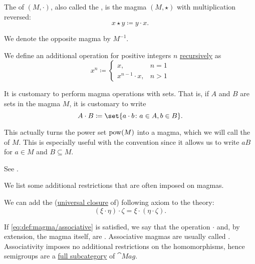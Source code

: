 \begin{definition}
\begin{thmenum}[series=def:magma]
     The  of \( (M, \cdot) \), also called the , is the magma \( (M, \star) \) with multiplication reversed:
    \begin{equation*}
      x \star y \coloneqq y \cdot x.
    \end{equation*}

    We denote the opposite magma by \( M^{-1} \).

     We define an additional  operation for positive integers \( n \) \hyperref[rem:natural_number_recursion]{recursively} as
    \begin{equation}\label{eq:def:magma/exponentiation}
      x^n \coloneqq \begin{cases}
        x,               &n = 1 \\
        x^{n-1} \cdot x, &n > 1
      \end{cases}
    \end{equation}

     It is customary to perform magma operations with sets. That is, if \( A \) and \( B \) are sets in the magma \( M \), it is customary to write
    \begin{equation*}
      A \cdot B \coloneqq \set{ a \cdot b \colon a \in A, b \in B }.
    \end{equation*}

    This actually turns the power set \( \operatorname{pow}(M) \) into a magma, which we will call the  of \( M \). This is especially useful with the convention  since it allows us to write \( aB \) for \( a \in M \) and \( B \subseteq M \).

    See .
  \end{thmenum}

  We list some additional restrictions that are often imposed on magmas.
  \begin{thmenum}[resume=def:magma]
     We can add the (\hyperref[thm:implicit_universal_quantification]{universal closure} of) following axiom to the theory:
    \begin{equation}\label{eq:def:magma/associative}
      (\xi \cdot \eta) \cdot \zeta = \xi \cdot (\eta \cdot \zeta).
    \end{equation}

    If \eqref{eq:def:magma/associative} is satisfied, we say that the operation \( \cdot \) and, by extension, the magma itself, are . Associative magmas are usually called . Associativity imposes no additional restrictions on the homomorphisms, hence semigroups are a \hyperref[def:subcategory]{full subcategory} of \( \cat{Mag} \).


\end{thmenum}
\end{definition}
